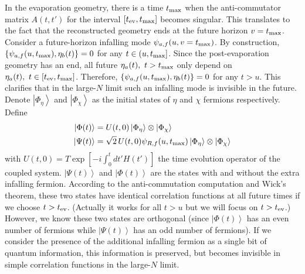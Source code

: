\documentclass[pdflatex,sn-nature]{sn-jnl}
\begin{document}
In the evaporation geometry, there is a time $t_{\rm max}$ when the anti-commutator matrix $A(t,t')$ for the interval $\left[t_{\rm ev},t_{\rm max}\right]$ becomes singular. This translates to the fact that the reconstructed geometry ends at the future horizon $v=t_{\rm max}$. Consider a future-horizon infalling mode $\psi_{a,f}(u,v=t_{\rm max})$. By construction, $\left\{\psi_{a,f}(u,t_{\rm max}),\eta_b(t)\right\}=0$ for any $t\in\left(u,t_{\rm max}\right]$. Since the post-evaporation geometry has an end, all future $\eta_a(t),~t>t_{\rm max}$ only depend on $\eta_a(t),~t\in[t_{\rm ev},t_{\rm max}]$. Therefore, $\left\{\psi_{a,f}(u,t_{\rm max}),\eta_b(t)\right\}=0$ for any $t>u$. This clarifies that in the large-$N$ limit such an infalling mode is invisible in the future. Denote $\left|\Phi_\eta\right\rangle$ and $\left|\Phi_\chi\right\rangle$ as the initial states of $\eta$ and $\chi$ fermions respectively. Define
\begin{align}
	\left|\Phi(t)\right\rangle&=U(t,0)\left|\Phi_\eta\right\rangle\otimes \left|\Phi_\chi\right\rangle\\
	\left|\Psi(t)\right\rangle&=\sqrt{2}\,U(t,0)\psi_{R,f}(u,t_{\rm max})\left|\Phi_\eta\right\rangle\otimes \left|\Phi_\chi\right\rangle
\end{align}
with $U(t,0)=T\exp\left[-i\int_0^tdt'H(t')\right]$ the time evolution operator of the coupled system. $\left|\Psi(t)\right\rangle$ and $\left|\Phi(t)\right\rangle$ are the states with and without the extra infalling fermion. According to the anti-commutation computation and Wick's theorem, these two states have identical correlation functions at all future times if we choose $t>t_{\rm ev}$. (Actually it works for all $t>u$ but we will focus on $t>t_{\rm ev}$.) However, we know these two states are orthogonal (since $\left|\Phi(t)\right\rangle$ has an even number of fermions while $\left|\Psi(t)\right\rangle$ has an odd number of fermions). If we consider the presence of the additional infalling fermion as a single bit of quantum information, this information is preserved, but becomes invisible in simple correlation functions in the large-$N$ limit.
\end{document}
